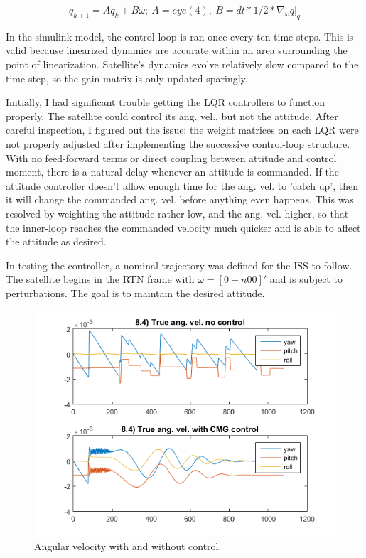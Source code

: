 \documentclass[12pt, letterpaper]{article}
\begin{document}
\begin{equation}
q_{k+1} = A q_k + B \omega;\ A = eye(4),\ B = dt*1/2*\nabla_\omega q|_q
\label{8:discreteQuat}
\end{equation}

In the simulink model, the control loop is ran once every ten time-steps. This is valid because linearized dynamics are accurate within an area surrounding the point of linearization. Satellite's dynamics evolve relatively slow compared to the time-step, so the gain matrix is only updated sparingly.

Initially, I had significant trouble getting the LQR controllers to function properly. The satellite could control its ang. vel., but not the attitude. After careful inspection, I figured out the issue: the weight matrices on each LQR were not properly adjusted after implementing the successive control-loop structure. With no feed-forward terms or direct coupling between attitude and control moment, there is a natural delay whenever an attitude is commanded. If the attitude controller doesn't allow enough time for the ang. vel. to 'catch up', then it will change the commanded ang. vel. before anything even happens. This was resolved by weighting the attitude rather low, and the ang. vel. higher, so that the inner-loop reaches the commanded velocity much quicker and is able to affect the attitude as desired.

In testing the controller, a nominal trajectory was defined for the ISS to follow. The satellite begins in the RTN frame with $\omega=[0 -n0 0]'$ and is subject to perturbations. The goal is to maintain the desired attitude.

\begin{figure}[H]
	\centering
	\includegraphics[scale=0.9]{ps8_01}
	\caption{Angular velocity with and without control.}
	\label{8:angvel}
\end{figure}
\end{document}
